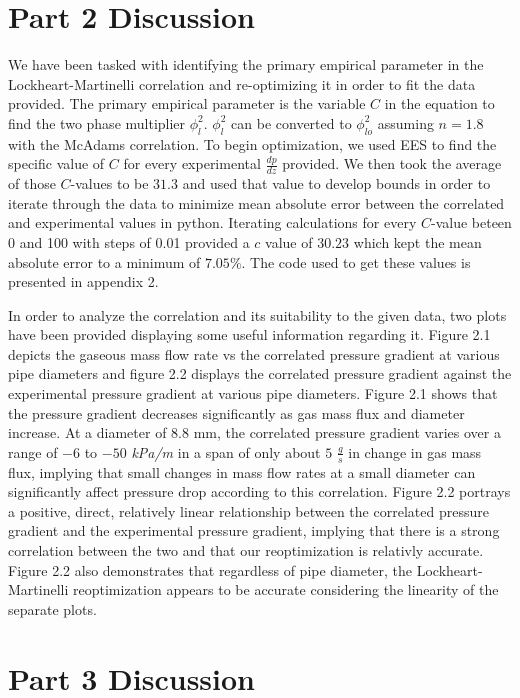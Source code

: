 \section{Part 2 Discussion}
\par
We have been tasked with identifying the primary empirical parameter in the Lockheart-Martinelli correlation and re-optimizing it in order to fit the data provided. The primary empirical parameter is the variable \(C\) in the equation to find the two phase multiplier $\phi_l^2$. $\phi_l^2$ can be converted to $\phi_{lo}^2$ assuming \(n = 1.8\) with the McAdams correlation. To begin optimization, we used EES to find the specific value of \(C\) for every 
experimental $\frac{dp}{dz}$ provided. We then took the average of those \(C\)-values to be \(31.3\) and used that value to develop bounds in order to iterate through the data to minimize mean absolute error between the correlated and experimental values in python. Iterating calculations for every \(C\)-value beteen 0 and 100 with steps of 0.01 provided a \(c\) value of \(30.23\) which kept the mean absolute error to a minimum of \(7.05\%\). The code used to get these values is presented in appendix 2.
\par
In order to analyze the correlation and its suitability to the given data, two plots have been provided displaying some useful information regarding it.
Figure 2.1 depicts the gaseous mass flow rate vs the correlated pressure gradient at various pipe diameters and figure 2.2 displays the correlated pressure gradient against the experimental pressure gradient at various pipe diameters. Figure 2.1 shows that the pressure gradient decreases significantly as gas mass flux and diameter increase. At a diameter of \(8.8\) mm, the correlated pressure gradient varies over a range of \(-6\) to \(-50\) \textit{kPa/m} in a span of only about \(5\) $\frac{g}{s}$ in change in gas mass flux, implying that small changes in mass flow rates at a small diameter can significantly affect pressure drop according to this correlation. Figure 2.2 portrays a positive, direct, relatively linear relationship between the correlated pressure gradient and the experimental pressure gradient, implying that there is a strong correlation between the two and that our reoptimization is relativly accurate. Figure 2.2 also demonstrates that regardless of pipe diameter, the Lockheart-Martinelli reoptimization appears to be accurate considering the linearity of the separate plots. 

\section{Part 3 Discussion}

